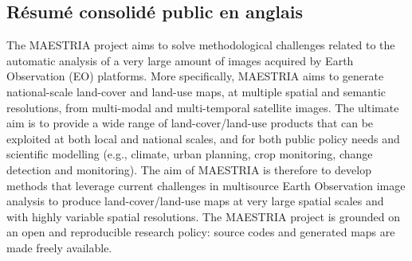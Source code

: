\subsection{Résumé consolidé public en anglais}

The MAESTRIA project aims to solve methodological challenges related to the automatic analysis of a very large amount of images acquired by Earth Observation (EO) platforms. More specifically, MAESTRIA aims to generate national-scale land-cover and land-use maps, at multiple spatial and semantic resolutions, from multi-modal and multi-temporal satellite images. The ultimate aim is to provide a wide range of land-cover/land-use products that can be exploited at both local and national scales, and for both public policy needs and scientific modelling (e.g., climate, urban planning, crop monitoring, change detection and monitoring). The aim of MAESTRIA is therefore to develop methods that leverage
current challenges in multisource Earth Observation image analysis
 to produce land-cover/land-use maps at very large spatial scales and with highly variable spatial resolutions. The MAESTRIA project is grounded on an open and reproducible research policy: source codes and generated maps are made freely available.